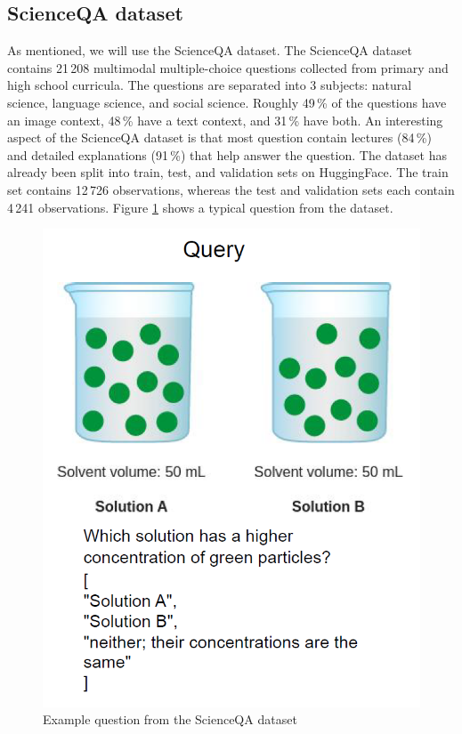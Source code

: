 \documentclass{article}
\begin{document}
\subsection{ScienceQA dataset}
As mentioned, we will use the ScienceQA dataset. The ScienceQA dataset contains 21\,208 multimodal multiple-choice questions collected from primary and high school curricula. The questions are separated into 3 subjects: natural science, language science, and social science. Roughly 49\,\% of the questions have an image context, 48\,\% have a text context, and 31\,\% have both. An interesting aspect of the ScienceQA dataset is that most question contain lectures (84\,\%) and detailed explanations (91\,\%) that help answer the question. The dataset has already been split into train, test, and validation sets on HuggingFace. The train set contains 12\,726 observations, whereas the test and validation sets each contain 4\,241 observations. Figure \ref{fig:example_q} shows a typical question from the dataset.

\begin{figure}
  \centering
  \centerline{\includegraphics[scale=0.5]{example_question.png}}
  \caption{Example question from the ScienceQA dataset}
  \label{fig:example_q}
\end{figure}
\end{document}
